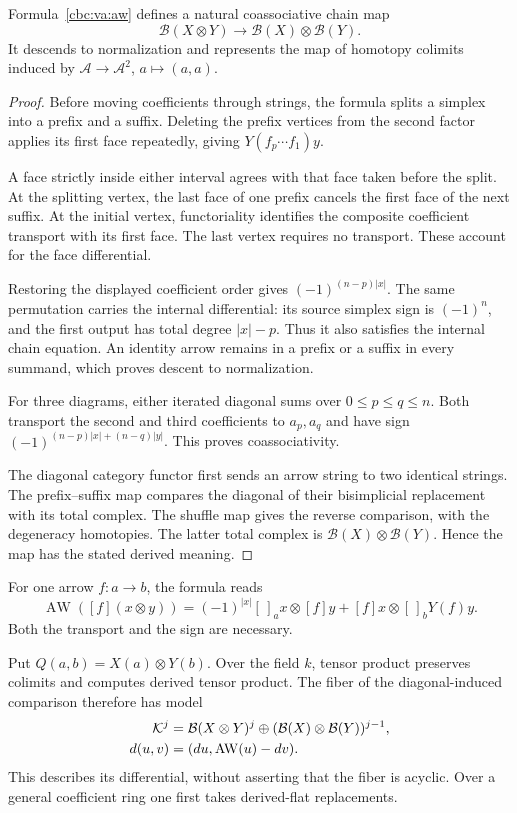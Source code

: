 \begin{proposition}\label{cbc:va:aw-chain}
Formula~\eqref{cbc:va:aw} defines a natural
coassociative chain map
\[
 \mathcal B(X\otimes Y)\longrightarrow
                         \mathcal B(X)\otimes\mathcal B(Y).
\]
It descends to normalization and represents the
map of homotopy colimits induced by
$\mathcal A\to\mathcal A^2$, $a\mapsto(a,a)$.
\end{proposition}
\begin{proof}
Before moving coefficients through strings,
the formula splits a simplex into a prefix
and a suffix. Deleting the prefix vertices
from the second factor applies its first
face repeatedly, giving $Y(f_p\cdots f_1)y$.

A face strictly inside either interval agrees
with that face taken before the split.
At the splitting vertex, the last face of
one prefix cancels the first face of the
next suffix. At the initial vertex,
functoriality identifies the composite
coefficient transport with its first face.
The last vertex requires no transport.
These account for the face differential.

Restoring the displayed coefficient order gives
$(-1)^{(n-p)|x|}$. The same permutation carries
the internal differential: its source
simplex sign is $(-1)^n$, and the first
output has total degree $|x|-p$.
Thus it also satisfies the internal chain
equation. An identity arrow remains in a
prefix or a suffix in every summand, which
proves descent to normalization.

For three diagrams, either iterated diagonal
sums over $0\leq p\leq q\leq n$.
Both transport the second and third coefficients
to $a_p,a_q$ and have sign
$(-1)^{(n-p)|x|+(n-q)|y|}$.
This proves coassociativity.

The diagonal category functor first sends an
arrow string to two identical strings.
The prefix--suffix map compares the diagonal
of their bisimplicial replacement with its
total complex. The shuffle map gives the
reverse comparison, with the degeneracy
homotopies. The latter total complex is
$\mathcal B(X)\otimes\mathcal B(Y)$.
Hence the map has the stated derived meaning.
\end{proof}

For one arrow $f:a\to b$, the formula reads
\[
 \operatorname{AW}([f](x\otimes y))
 =(-1)^{|x|}[\,]_ax\otimes[f]y
                   +[f]x\otimes[\,]_bY(f)y.
\]
Both the transport and the sign are necessary.

Put $Q(a,b)=X(a)\otimes Y(b)$. Over the field $k$,
tensor product preserves colimits and computes
derived tensor product. The fiber of the
diagonal-induced comparison therefore has model
\begin{align}
 \mathcal K^j&=\mathcal B(X\otimes Y)^j
     \oplus(\mathcal B(X)\otimes\mathcal B(Y))^{j-1},
 \notag\\
 d(u,v)&=(du,\operatorname{AW}(u)-dv).
 \label{cbc:va:action-bar-fibre}
\end{align}
This describes its differential, without
asserting that the fiber is acyclic.
Over a general coefficient ring one first
takes derived-flat replacements.

